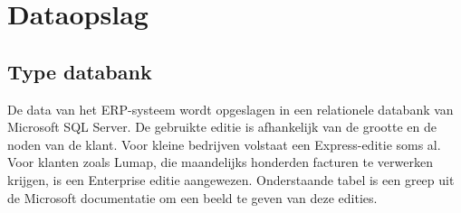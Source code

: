 \pagebreak

\section{Dataopslag}
\label{sec:dataopslag}

\subsection{Type databank}
\label{sub:type-databank}

De data van het ERP-systeem wordt opgeslagen in een relationele databank van Microsoft SQL Server. De gebruikte editie is afhankelijk van de grootte en de noden van de klant. Voor kleine bedrijven volstaat een Express-editie soms al. Voor klanten zoals Lumap, die maandelijks honderden facturen te verwerken krijgen, is een Enterprise editie aangewezen. Onderstaande tabel is een greep uit de Microsoft documentatie om een beeld te geven van deze edities.

